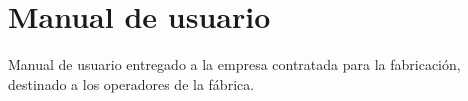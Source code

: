 
\chapter{Manual de usuario} %

\label{app:usermanual} %

Manual de usuario entregado a la empresa contratada para la fabricación, destinado a los operadores de la fábrica.

\newpage


